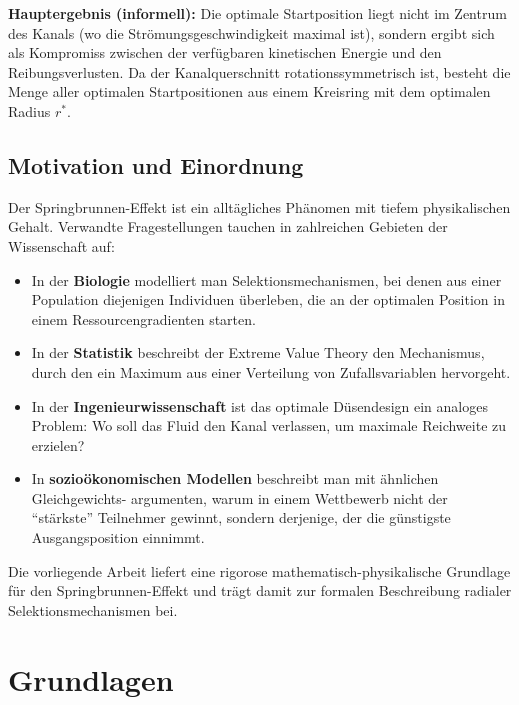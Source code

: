 ﻿\documentclass[a4paper,12pt]{article}
\theoremstyle{definition}
\begin{document}
\textbf{Hauptergebnis (informell):} Die optimale Startposition liegt nicht im Zentrum des
Kanals (wo die Strömungsgeschwindigkeit maximal ist), sondern ergibt sich als Kompromiss
zwischen der verfügbaren kinetischen Energie und den Reibungsverlusten. Da der
Kanalquerschnitt rotationssymmetrisch ist, besteht die Menge aller optimalen
Startpositionen aus einem Kreisring mit dem optimalen Radius $r^*$.

\subsection{Motivation und Einordnung}

Der Springbrunnen-Effekt ist ein alltägliches Phänomen mit tiefem physikalischen Gehalt.
Verwandte Fragestellungen tauchen in zahlreichen Gebieten der Wissenschaft auf:

\begin{itemize}
    \item In der \textbf{Biologie} modelliert man Selektionsmechanismen, bei denen aus
          einer Population diejenigen Individuen überleben, die an der optimalen Position
          in einem Ressourcengradienten starten.
    \item In der \textbf{Statistik} beschreibt der Extreme Value Theory den Mechanismus,
          durch den ein Maximum aus einer Verteilung von Zufallsvariablen hervorgeht.
    \item In der \textbf{Ingenieurwissenschaft} ist das optimale Düsendesign ein analoges
          Problem: Wo soll das Fluid den Kanal verlassen, um maximale Reichweite zu erzielen?
    \item In \textbf{sozioökonomischen Modellen} beschreibt man mit ähnlichen Gleichgewichts-
          argumenten, warum in einem Wettbewerb nicht der ``stärkste'' Teilnehmer gewinnt,
          sondern derjenige, der die günstigste Ausgangsposition einnimmt.
\end{itemize}

Die vorliegende Arbeit liefert eine rigorose mathematisch-physikalische Grundlage für
den Springbrunnen-Effekt und trägt damit zur formalen Beschreibung radialer
Selektionsmechanismen bei.

\section{Grundlagen}
\end{document}
